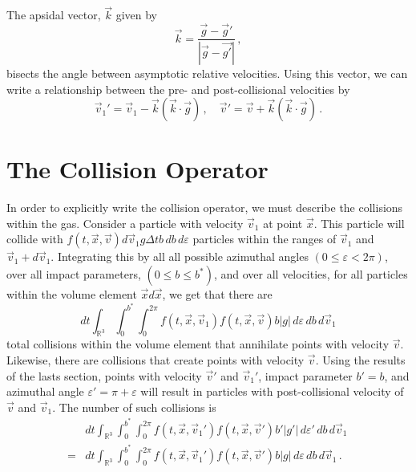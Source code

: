 \documentclass[12pt]{CSUNthesis}
\def\R{\mathbb{R}}
\def\R{\mathbb{R}}
\newcommand{\vecx}{\vec{x}}
\newcommand{\vecv}{\vec{v}}
\begin{document}
The apsidal vector, $\vec{k}$ given by
\begin{equation*}
\vec{k} = \frac{\vec{g} - \vec{g}'}{|\vec{g} - \vec{g'}|}\, ,
\end{equation*}
bisects the angle between asymptotic relative velocities. Using this vector, we can write a relationship between the pre- and post-collisional velocities by
\begin{equation}
\label{eq:vel_relation}
\vec{v}_1' = \vec{v}_1 - \vec{k}(\vec{k} \cdot \vec{g})\, , \quad \vec{v}' = \vec{v} + \vec{k}(\vec{k} \cdot \vec{g})\, .
\end{equation}


\section{The Collision Operator}



In order to explicitly write the collision operator, we must describe the collisions within the gas. Consider a particle with velocity $\vecv_1$ at point $\vecx$. This particle will collide with $f(t,\vecx, \vecv)d\vecv_1 g \Delta t b \, db \, d\varepsilon$ particles within the ranges of $\vecv_1$ and $\vecv_1 + d\vecv_1$. Integrating this by all all possible azimuthal angles $(0 \leq \varepsilon < 2 \pi)$, over all impact parameters, $(0 \leq b \leq b^*)$, and over all velocities, for all particles within the volume element $\vecx d\vecx$, we get that there are 
\begin{equation}
\label{eq:depletion}
dt \int_{\R^3} \int_0^{b^*} \int_0^{2\pi} f(t, \vecx, \vecv_1) f(t, \vecx, \vecv) b |g|\, d\varepsilon\,  db \,  d\vecv_1 
\end{equation}
total collisions within the volume element that annihilate points with velocity $\vecv$. Likewise, there are collisions that create points with velocity $\vecv$. Using the results of the lasts section, points with velocity $\vecv'$ and $\vecv_1'$, impact parameter $b'=b$, and azimuthal angle $\varepsilon' = \pi + \varepsilon$ will result in particles with post-collisional velocity of $\vecv$ and $\vecv_1$. The number of such collisions is
\begin{equation}
\label{eq:restitution}
\begin{split}
&dt \int_{\R^3} \int_0^{b^*} \int_0^{2\pi} f(t, \vecx, \vecv_1') f(t, \vecx, \vecv') b' |g'| \, d\varepsilon'\,  db\, d\vecv_1 \,  \\
=&dt \int_{\R^3} \int_0^{b^*} \int_0^{2\pi} f(t, \vecx, \vecv_1') f(t, \vecx, \vecv') b |g|\,   d\varepsilon\, db \, d\vecv_1 \, .
\end{split}
\end{equation}
\end{document}

